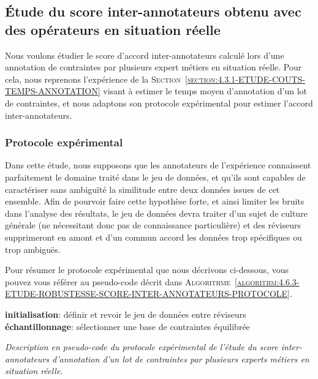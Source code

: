 			
	\subsection{Étude du score inter-annotateurs obtenu avec des opérateurs en situation réelle}
	\label{section:4.6.3-ETUDE-ROBUSTESSE-SCORE-INTER-ANNOTATEURS}
		
		Nous voulons étudier le score d'accord inter-annotateurs calculé lors d'une annotation de contraintes par plusieurs expert métiers en situation réelle.
		Pour cela, nous reprenons l'expérience de la \textsc{Section~\ref{section:4.3.1-ETUDE-COUTS-TEMPS-ANNOTATION}} visant à estimer le temps moyen d'annotation d'un lot de contraintes, et nous adaptons son protocole expérimental pour estimer l'accord inter-annotateurs.
		
	
		\subsubsection{Protocole expérimental}
			
			\begin{leftBarWarning}
				Dans cette étude, nous supposons que les annotateurs de l'expérience connaissent parfaitement le domaine traité dans le jeu de données, et qu'ils sont capables de caractériser sans ambiguïté la similitude entre deux données issues de cet ensemble.
				Afin de pourvoir faire cette hypothèse forte, et ainsi limiter les bruits dans l'analyse des résultats, le jeu de données devra traiter d'un sujet de culture générale (ne nécessitant donc pas de connaissance particulière) et des réviseurs supprimeront en amont et d'un commun accord les données trop spécifiques ou trop ambiguës.
			\end{leftBarWarning}
			
			Pour résumer le protocole expérimental que nous décrivons ci-dessous, vous pouvez vous référer au pseudo-code décrit dans \textsc{Algorithme~\ref{algorithm:4.6.3-ETUDE-ROBUSTESSE-SCORE-INTER-ANNOTATEURS-PROTOCOLE}}.

			\begin{algorithm}
				\textbf{initialisation}: définir et revoir le jeu de données entre réviseurs \;
				\textbf{échantillonnage}: sélectionner une base de contraintes équilibrée \;
				\caption{\textit{
					Description en pseudo-code du protocole expérimental de l'étude du score inter-annotateurs d'annotation d'un lot de contraintes par plusieurs experts métiers en situation réelle.
				}}
				\label{algorithm:4.6.3-ETUDE-ROBUSTESSE-SCORE-INTER-ANNOTATEURS-PROTOCOLE}
			\end{algorithm}
			
